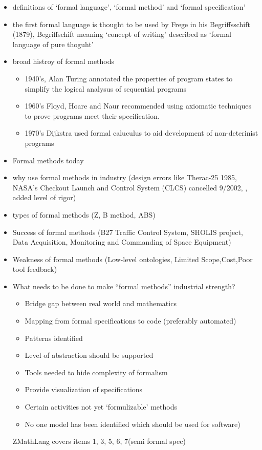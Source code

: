 \begin{itemize}
\item definitions of `formal language', `formal method' and `formal specification'

\item the first formal language is thought to be used by Frege in his Begriffsschift (1879), Begriffschift meaning `concept of writing' described as `formal language of pure thoguht'

\item broad histroy of formal methods 

\begin{itemize}
\item 1940's, Alan Turing annotated the properties of program states to simplify the logical analysus of sequential programs

\item 1960's Floyd, Hoare and Naur recommended using axiomatic techniques to prove programs meet their specification.

\item 1970's Dijkstra used formal caluculus to aid development of non-deterinist programs
\end{itemize}

\item Formal methods today

\item why use formal methods in industry (design errors like Therac-25 1985, NASA’s Checkout Launch and Control System (CLCS) cancelled 9/2002, , added level of rigor)

\item types of formal methods (Z, B method, ABS)

\item Success of formal methods (B27 Traffic Control System, SHOLIS project, Data Acquisition, Monitoring and Commanding of Space Equipment)

\item Weakness of formal methods (Low-level ontologies, Limited Scope,Cost,Poor tool feedback)

\item What needs to be done to make “formal methods” industrial strength? 
\begin{itemize}
\item Bridge gap between real world and mathematics
\item Mapping from formal specifications to code (preferably automated)
\item Patterns identified
\item Level of abstraction should be supported
\item Tools needed to hide complexity of formalism
\item Provide visualization of specifications 
\item Certain activities not yet ‘formulizable’ methods
\item No one model has been identified which should be used for software)
\end{itemize}
ZMathLang covers items 1, 3, 5, 6, 7(semi formal spec)
\end{itemize}

